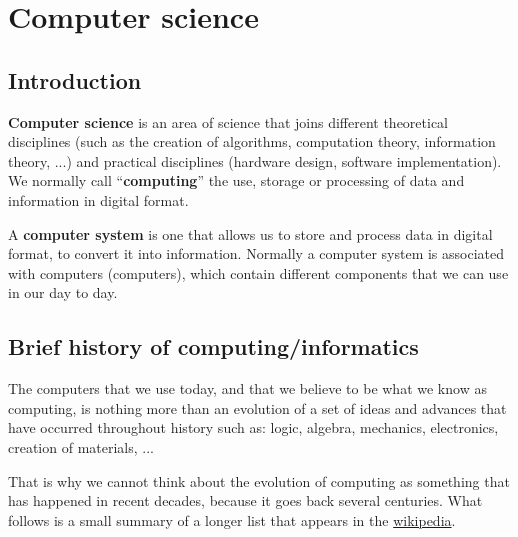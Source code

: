 \vfill
\pagebreak

\chapter{Computer science}

\section{Introduction}

\textbf{Computer science} is an area of science that joins different theoretical disciplines (such as the creation of algorithms, computation theory, information theory, ...) and practical disciplines (hardware design, software implementation). We normally call “\textbf{computing}” the use, storage or processing of data and information in digital format.

A \textbf{computer system} is one that allows us to store and process data in digital format, to convert it into information. Normally a computer system is associated with computers (computers), which contain different components that we can use in our day to day.

\section{Brief history of computing/informatics}

The computers that we use today, and that we believe to be what we know as computing, is nothing more than an evolution of a set of ideas and advances that have occurred throughout history such as: logic, algebra, mechanics, electronics, creation of materials, ...

That is why we cannot think about the evolution of computing as something that has happened in recent decades, because it goes back several centuries. What follows is a small summary of a longer list that appears in the \href{https://es.wikipedia.org/wiki/Anexo:Historia_de_la_computaci%C3%B3n}{wikipedia}.

